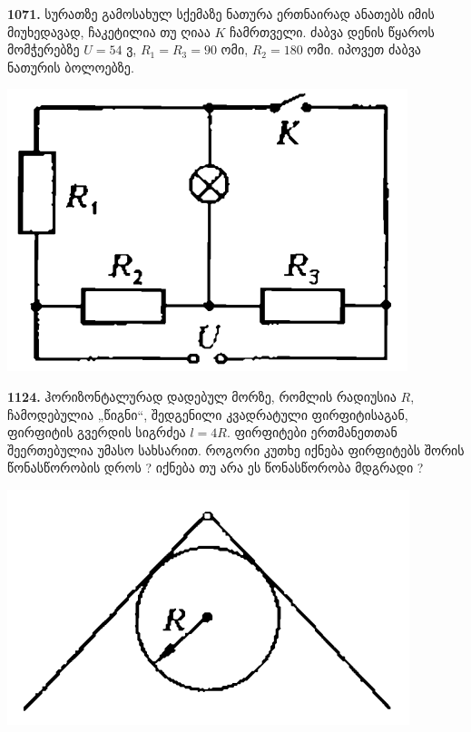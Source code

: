 \documentclass[12pt,a4paper,]{report}
\begin{document}
\textbf{1071.} სურათზე გამოსახულ სქემაზე ნათურა ერთნაირად ანათებს იმის მიუხედავად, ჩაკეტილია თუ ღიაა $K$ ჩამრთველი. ძაბვა დენის წყაროს მომჭერებზე $U=54$ ვ, $R_1=R_3=90$ ომი, $R_2=180$ ომი. იპოვეთ ძაბვა ნათურის ბოლოებზე.
		\begin{center}
			\includegraphics[scale=0.3]{images/F1071.png}
		\end{center}
	
\textbf{1124.} ჰორიზონტალურად დადებულ მორზე, რომლის რადიუსია $R$, ჩამოდებულია „წიგნი“, შედგენილი კვადრატული ფირფიტისაგან, ფირფიტის გვერდის სიგრძეა $l=4R$. ფირფიტები ერთმანეთთან შეერთებულია უმასო სახსარით. როგორი კუთხე იქნება ფირფიტებს შორის წონასწორობის დროს ? იქნება თუ არა ეს წონასწორობა მდგრადი ?
		\begin{center}
			\includegraphics[scale=0.2]{images/F1124.png}
		\end{center}
\end{document}
